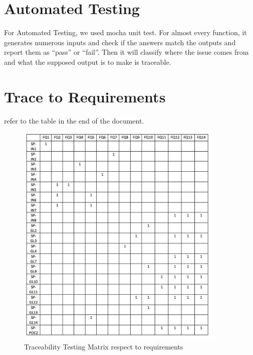 \documentclass[12pt, titlepage]{article}
\begin{document}
\section{Automated Testing}
\tab For Automated Testing, we used mocha unit test. For almost every function, it generates numerous inputs and check if the answers match the outputs and report them as “pass” or “fail”. Then it will classify where the issue comes from and what the supposed output is to make is traceable.	
\section{Trace to Requirements}
refer to the table in the end of the document.
\begin{figure}[h]
\centering
\includegraphics[width=0.9\textwidth]{traceq.png}
\caption{{\color{red}Traceability Testing Matrix respect to requirements}}
\label{FigUH}
\end{figure}		
\end{document}
